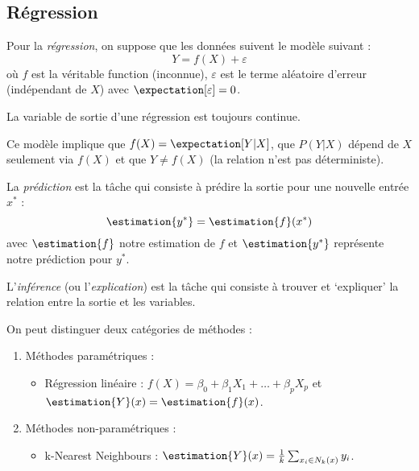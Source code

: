 \subsection{Régression}
    \begin{definition}
        Pour la \textit{régression}, on suppose que les données suivent le modèle suivant :
        \[
            Y = f(X) + \varepsilon
        \]
        où \(f\) est la véritable function (inconnue), \(\varepsilon\) est le terme aléatoire d'erreur (indépendant de \(X\)) avec \(\expectation[\varepsilon] = 0\).

        La variable de sortie d'une régression est toujours continue.
    \end{definition}

    Ce modèle implique que \(f(X) = \expectation[Y|X]\), que \(P(Y|X)\) dépend de \(X\) seulement via \(f(X)\) et que \(Y \not= f(X)\) (la relation n'est pas déterministe).

    \begin{definition}[Tâches]
        La \textit{prédiction} est la tâche qui consiste à prédire la sortie pour une nouvelle entrée \(x^*\) :
        \[\estimation{y^*} = \estimation{f}(x^*)\]
        avec \(\estimation{f}\) notre estimation de \(f\) et \(\estimation{y^*}\) représente notre prédiction pour \(y^*\).

        L'\textit{inférence} (ou l'\textit{explication}) est la tâche qui consiste à trouver et `expliquer' la relation entre la sortie et les variables.
    \end{definition}

    On peut distinguer deux catégories de méthodes :
    \begin{enumerate}
        \item Méthodes paramétriques :
        \begin{itemize}
            \item Régression linéaire : \(f(X) = \beta_0 + \beta_1X_1 + \dots + \beta_pX_p\) et \(\estimation{Y}(x) = \estimation{f}(x)\).
        \end{itemize}
        \item Méthodes non-paramétriques :
        \begin{itemize}
            \item k-Nearest Neighbours : \(\estimation{Y}(x) = \frac{1}{k}\sum_{x_i\in N_k(x)} y_i\).
        \end{itemize}
    \end{enumerate}

